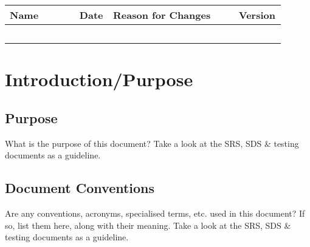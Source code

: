 \documentclass{scrreprt}
\begin{document}
\begin{table}[h!]
\centering
\begin{tabular}{|p{0.25\linewidth}
                |p{0.1\linewidth}
                |p{0.45\linewidth}
                |p{0.1\linewidth}|}
    \hline
    Name & Date & Reason for Changes & Version \\
    \hline
         &      &                    &         \\
    \hline
         &      &                    &         \\
    \hline
         &      &                    &         \\
    \hline
        &      &                    &         \\
    \hline
        &      &                    &         \\
    \hline
\end{tabular}
\end{table}



% 
% 
%
\chapter{Introduction/Purpose}

% 
% 
\section{Purpose}

What is the purpose of this document? Take a look at the SRS, SDS \& testing documents as a guideline.

% 
% 
\section{Document Conventions}

Are any conventions, acronyms, specialised terms, etc. used in this document? If so, list them here, along with their meaning. Take a look at the SRS, SDS \& testing documents as a guideline.
\end{document}
